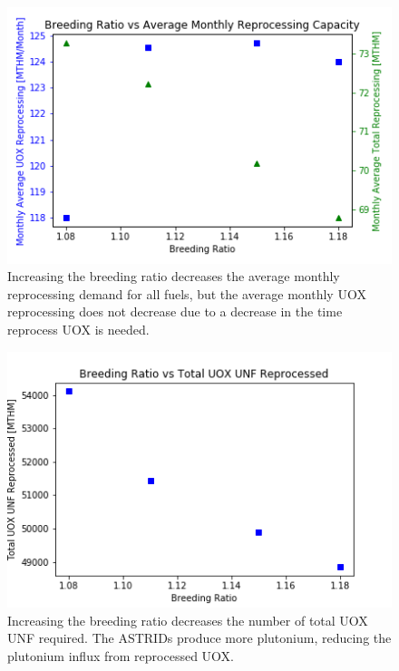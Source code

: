 \begin{figure}[htbp!]
    \begin{center}
        \includegraphics[scale=0.6]{./images/sensitivity/br.png}
    \end{center}
    \caption{Increasing the breeding ratio decreases the average monthly reprocessing demand for all fuels,
             but the average monthly \gls{UOX} reprocessing does not decrease due to a decrease in the time reprocess \gls{UOX} is needed. }
    \label{fig:br_rep}
\end{figure}


\begin{figure}[htbp!]
    \begin{center}
        \includegraphics[scale=0.6]{./images/sensitivity/br_uox.png}
    \end{center}
    \caption{Increasing the breeding ratio decreases the number of total \gls{UOX} \gls{UNF}
             required. The \glspl{ASTRID} produce more plutonium, reducing the plutonium influx
             from reprocessed \gls{UOX}.}
    \label{fig:br_uox}
\end{figure}


